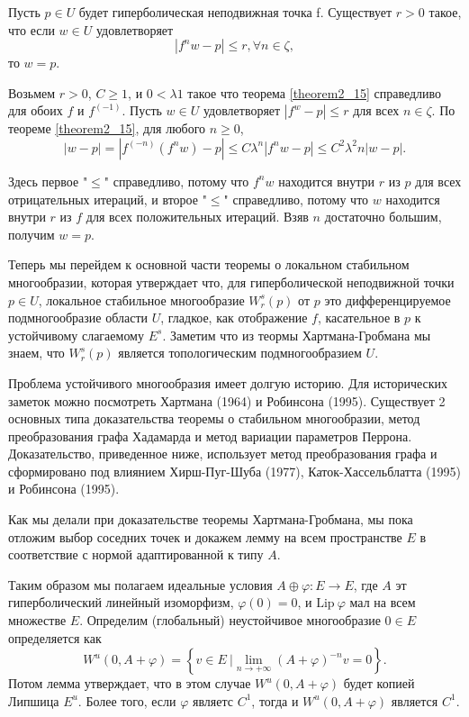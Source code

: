 \begin{theorem}
\label{theorem2_16}
Пусть $p \in U$ будет гиперболическая неподвижная точка f. Существует $r > 0$ такое, что если $w \in U$ удовлетворяет
$$
|f^n w - p| \leqslant r, \forall n \in \zeta,
$$
то $w = p$.
\end{theorem}
\begin{demo} 
Возьмем $r > 0$, $C \geqslant 1$, и $0 < \lambda 1$ такое что теорема \ref{theorem2_15} справедливо для обоих $f$  и $f^(-1)$. Пусть $w \in U$ удовлетворяет $|f^ w - p| \leqslant r$ для всех $n \in \zeta$. По теореме \ref{theorem2_15}, для любого $n \geqslant 0$,
$$
|w - p| = |f^(-n)(f^n w) - p| \leqslant C \lambda^n |f^n w - p| \leqslant C^2 \lambda^2n |w - p|.
$$

Здесь первое "$\leq$" справедливо, потому что $f^n w$ находится внутри $r$ из $p$ для всех отрицательных итераций, и второе "$\leq$" справедливо, потому что $w$ находится внутри $r$ из $f$ для всех положительных итераций. Взяв $n$  достаточно большим, получим $w = p$. 

Теперь мы перейдем к основной части теоремы о локальном стабильном многообразии, которая утверждает что, для гиперболической неподвижной точки $p \in U$, локальное стабильное многообразие $W_r^s(p)$ от $p$ это дифференцируемое подмногообразие области $U$, гладкое, как отображение $f$, касательное в $p$ к устойчивому слагаемому $E^s$. Заметим что из теормы Хартмана-Гробмана мы знаем, что $W_r^s(p)$ является топологическим подмногообразием $U$. 

Проблема устойчивого многообразия имеет долгую историю. Для исторических заметок можно посмотреть Хартмана (1964) и Робинсона (1995). Существует 2 основных типа доказательства теоремы о стабильном многообразии, метод преобразования графа Хадамарда и метод вариации параметров Перрона. Доказательство, приведенное ниже, использует метод преобразования графа и сформировано под влиянием Хирш-Пуг-Шуба (1977), Каток-Хассельблатта (1995) и Робинсона (1995). 

Как мы делали при доказательстве теоремы Хартмана-Гробмана, мы пока отложим выбор соседних точек и докажем лемму на всем пространстве $E$ в соответствие с нормой адаптированной к типу $A$. 

Таким образом мы полагаем идеальные условия $A \oplus \varphi : E \rightarrow E$, где $A$ эт гиперболический линейный изоморфизм, $\varphi(0)=0$, и $\mathrm{Lip} \  \varphi$ мал на всем множестве $E$. Определим (глобальный) неустойчивое многообразие $0 \in E$ определяется как
$$
W^u(0,A+\varphi) = \left\{ v \in E \ | \lim_{n\rightarrow + \infty}{(A+\varphi)^{-n}v=0} \right\}.
$$
Потом лемма утверждает, что в этом случае $W^u(0,A+\varphi)$ будет копией Липшица $E^u$. Более того, если $\varphi$ являетс $C^1$, тогда и $W^u(0, A + \varphi)$ является $C^1$.
\end{demo}
